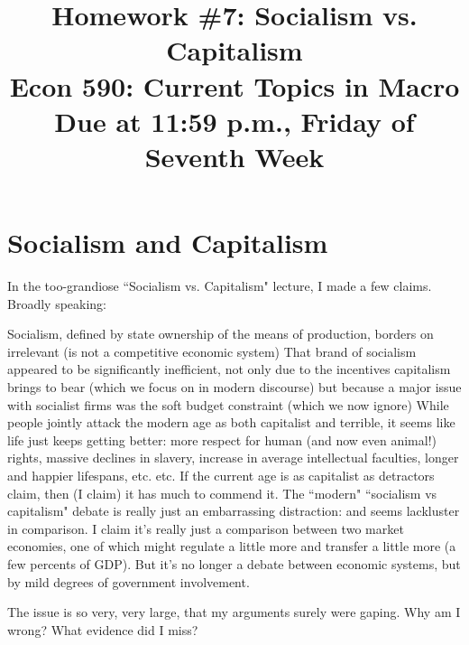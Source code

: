 \documentclass[a4paper]{article}
\title{{\Large \bf Homework \#7: Socialism vs. Capitalism} \\ \small Econ 590: Current Topics in Macro \\ \small Due at  11:59 p.m., Friday of Seventh Week}
\date{}
\renewcommand{\item}{\itemindent1cm\itemold}
\begin{document}
\maketitle
 
\noindent

\section*{Socialism and Capitalism}
 In the too-grandiose ``Socialism vs. Capitalism" lecture, I made a few claims.  Broadly speaking:
\begin{itemize}
\item Socialism, defined by state ownership of the means of production, borders on irrelevant (is not a competitive economic system)
\item That brand of socialism appeared to be significantly inefficient, not only due to the incentives capitalism brings to bear (which we focus on in modern discourse) but because a major issue with socialist firms was the soft budget constraint (which we now ignore)
\item While people jointly attack the modern age as both capitalist and terrible, it seems like life just keeps getting better: more respect for human (and now even animal!) rights, massive declines in slavery, increase in average intellectual faculties, longer and happier lifespans, etc. etc.  If the current age is as capitalist as detractors claim, then (I claim) it has much to commend it.
\item The ``modern"  ``socialism vs capitalism" debate is really just an embarrassing distraction: and seems lackluster in comparison.  I claim it's really just a comparison between two market economies, one of which might regulate a little more and transfer a little more (a few percents of GDP).  But it's no longer a debate between economic systems, but by mild degrees of government involvement.
\end{itemize} 

The issue is so very, very large, that my arguments surely were gaping.  Why am I wrong? What evidence did I miss?   
\end{document}
